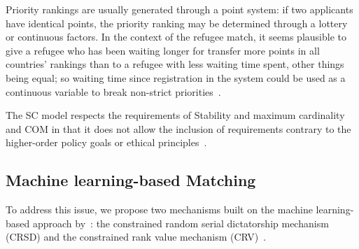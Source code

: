 Priority rankings are usually generated through a point system: if two applicants have identical points, the priority ranking may be determined through a lottery or continuous factors.
In the context  of the refugee match, it seems plausible to give a refugee who has been waiting longer for transfer  more points in all countries’ rankings than to a refugee with less waiting time spent, other things being  equal;
so waiting time since registration in the system could be used as a continuous variable to break non-strict priorities~\cite{basshuysen}.

The SC model respects the requirements of Stability and maximum cardinality and COM in that it does not allow the inclusion of requirements contrary to the higher-order policy goals or ethical principles~\cite{basshuysen}.


\subsection{Machine learning-based Matching}\label{machine-learning-based-matching}%

To address this issue, we propose two mechanisms built on the machine learning-based approach by~\citet{bansak_2018}: the constrained random serial dictatorship mechanism
(CRSD) and the constrained rank value mechanism (CRV)~\citet{olbergml}.



